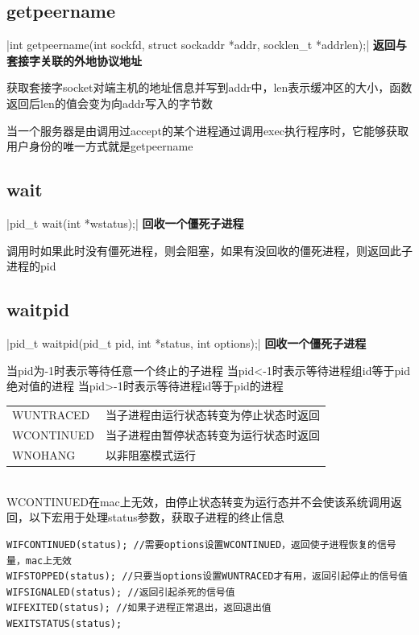 \subsection{getpeername}
|int getpeername(int sockfd, struct sockaddr *addr, socklen_t *addrlen);|
\noindent \textbf{返回与套接字关联的外地协议地址}
\begin{spacing}{2.0}
获取套接字socket对端主机的地址信息并写到addr中，len表示缓冲区的大小，函数返回后len的值会变为向addr写入的字节数

当一个服务器是由调用过accept的某个进程通过调用exec执行程序时，它能够获取用户身份的唯一方式就是getpeername

\end{spacing}
\newpage

\subsection{wait}
|pid_t wait(int *wstatus);|
\noindent \textbf{回收一个僵死子进程}
\begin{spacing}{2.0}
调用时如果此时没有僵死进程，则会阻塞，如果有没回收的僵死进程，则返回此子进程的pid
\end{spacing}
\newpage

\subsection{waitpid}
|pid_t waitpid(pid_t pid, int *status, int options);|
\noindent \textbf{回收一个僵死子进程}
\begin{spacing}{2.0}
当pid为-1时表示等待任意一个终止的子进程
当pid<-1时表示等待进程组id等于pid绝对值的进程
当pid>-1时表示等待进程id等于pid的进程
\end{spacing}
\noindent{\large\color[rgb]{0.2,0.4,0.6}{options:}}
\begin{table}[!htb]
\centering
	\begin{tabular}{l|l}
	WUNTRACED & 当子进程由运行状态转变为停止状态时返回 \\
	WCONTINUED & 当子进程由暂停状态转变为运行状态时返回 \\
	WNOHANG & 以非阻塞模式运行
	\end{tabular}
\end{table}
\\ WCONTINUED在mac上无效，由停止状态转变为运行态并不会使该系统调用返回，以下宏用于处理status参数，获取子进程的终止信息
\begin{verbatim}
WIFCONTINUED(status); //需要options设置WCONTINUED，返回使子进程恢复的信号量，mac上无效
WIFSTOPPED(status); //只要当options设置WUNTRACED才有用，返回引起停止的信号值
WIFSIGNALED(status); //返回引起杀死的信号值
WIFEXITED(status); //如果子进程正常退出，返回退出值
WEXITSTATUS(status);
\end{verbatim}
\newpage

